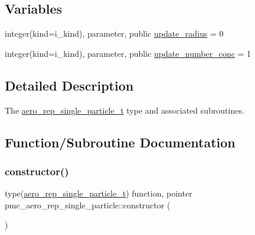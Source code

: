 \subsection*{Variables}
\begin{DoxyCompactItemize}
\item 
integer(kind=i\+\_\+kind), parameter, public \mbox{\hyperlink{namespacepmc__aero__rep__single__particle_a7b52abb1a4a88c92c6239fee67487245}{update\+\_\+radius}} = 0
\item 
integer(kind=i\+\_\+kind), parameter, public \mbox{\hyperlink{namespacepmc__aero__rep__single__particle_a6ff4b5b0738de8bfffb6b6e019bf8489}{update\+\_\+number\+\_\+conc}} = 1
\end{DoxyCompactItemize}


\subsection{Detailed Description}
The \mbox{\hyperlink{structpmc__aero__rep__single__particle_1_1aero__rep__single__particle__t}{aero\+\_\+rep\+\_\+single\+\_\+particle\+\_\+t}} type and associated subroutines. 

\subsection{Function/\+Subroutine Documentation}
\mbox{\label{namespacepmc__aero__rep__single__particle_a610bc0a2fce99673f7e593667eff1b7e}} 
\subsubsection{\texorpdfstring{constructor()}{constructor()}}
{\footnotesize\ttfamily type(\mbox{\hyperlink{structpmc__aero__rep__single__particle_1_1aero__rep__single__particle__t}{aero\+\_\+rep\+\_\+single\+\_\+particle\+\_\+t}}) function, pointer pmc\+\_\+aero\+\_\+rep\+\_\+single\+\_\+particle\+::constructor (\begin{DoxyParamCaption}{ }\end{DoxyParamCaption})\hspace{0.3cm}{\ttfamily [private]}}



